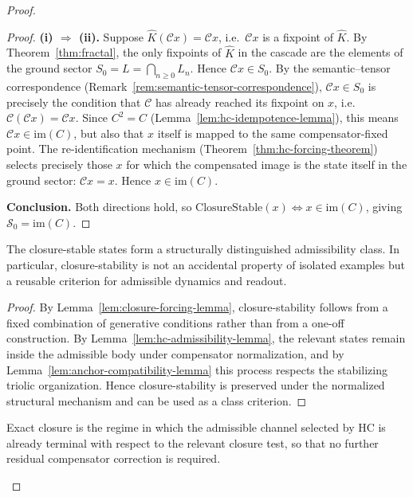 \begin{proof}
\begin{proof}
\smallskip
\textbf{(i) $\Rightarrow$ (ii).}
Suppose $\hat{K}(\mathcal{C}x) = \mathcal{C}x$, i.e.\ $\mathcal{C}x$ is a fixpoint of $\hat{K}$.
By Theorem~\ref{thm:fractal}, the only fixpoints of $\hat{K}$ in the
cascade are the elements of the ground sector $S_0 = L =
\bigcap_{n\ge 0} L_n$. Hence $\mathcal{C}x \in S_0$.
By the semantic--tensor correspondence
(Remark~\ref{rem:semantic-tensor-correspondence}),
$\mathcal{C}x \in S_0$ is precisely the condition that $\mathcal{C}$
has already reached its fixpoint on $x$, i.e.\ $\mathcal{C}(\mathcal{C}x)
= \mathcal{C}x$. Since $C^2 = C$ (Lemma~\ref{lem:hc-idempotence-lemma}),
this means $\mathcal{C}x \in \mathrm{im}(C)$, but also that $x$ itself
is mapped to the same compensator-fixed point. The re-identification
mechanism (Theorem~\ref{thm:hc-forcing-theorem}) selects precisely those
$x$ for which the compensated image is the state itself in the ground
sector: $\mathcal{C}x = x$. Hence $x \in \mathrm{im}(C)$.

\smallskip
\textbf{Conclusion.}
Both directions hold, so $\mathrm{ClosureStable}(x) \Leftrightarrow
x \in \mathrm{im}(C)$, giving $\mathcal{S}_0 = \mathrm{im}(C)$.
\end{proof}

\begin{proposition}
\label{prop:closure-class-proposition}
The closure-stable states form a structurally distinguished admissibility class.
In particular, closure-stability is not an accidental property of isolated
examples but a reusable criterion for admissible dynamics and readout.
\end{proposition}

\begin{proof}
By Lemma~\ref{lem:closure-forcing-lemma}, closure-stability follows from a fixed
combination of generative conditions rather than from a one-off construction.
By Lemma~\ref{lem:hc-admissibility-lemma}, the relevant states remain inside the
admissible body under compensator normalization, and by
Lemma~\ref{lem:anchor-compatibility-lemma} this process respects the stabilizing
triolic organization. Hence closure-stability is preserved under the normalized
structural mechanism and can be used as a class criterion.
\end{proof}

\begin{proposition}
\label{prop:exact-closure-criterion}
Exact closure is the regime in which the admissible channel selected by HC is
already terminal with respect to the relevant closure test, so that no further
residual compensator correction is required.
\end{proposition}


\end{proof}
